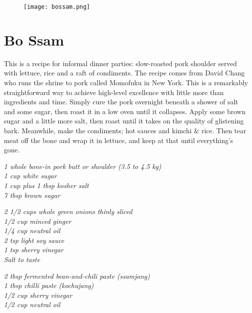 \documentclass{tufte-book}
\begin{document}
\begin{figure}[h]
  \texttt{[image: bossam.png]}
\end{figure}

\section{Bo Ssam}

This is a recipe for informal dinner parties: slow-roasted pork shoulder served with lettuce, rice and a raft of condiments. The recipe comes from  David Chang who runs the shrine to pork called  Momofuku in New York. This is a remarkably straightforward way to achieve high-level excellence with little more than ingredients and time. Simply cure the pork overnight beneath a shower of salt and some sugar, then roast it in a low oven until it collapses. Apply some brown sugar and a little more salt, then roast until it takes on the quality of glistening bark. Meanwhile, make the condiments; hot sauces and kimchi \& rice. Then tear meat off the bone and wrap it in lettuce, and keep at that until everything's gone.


\emph{1 whole bone-in pork butt or shoulder (3.5 to 4.5 kg)
\\1 cup white sugar
\\1 cup plus 1 tbsp kosher salt
\\7 tbsp brown sugar
}


\emph{2 1/2 cups whole green onions thinly sliced
\\1/2 cup minced ginger
\\1/4 cup neutral oil
\\2 tsp light soy sauce
\\1 tsp sherry vinegar
\\Salt to taste
}


\emph{2 tbsp fermented bean-and-chili paste (ssamjang)
\\1 tbsp chilli paste (kochujang)
\\1/2 cup sherry vinegar
\\1/2 cup neutral oil
}
\end{document}
